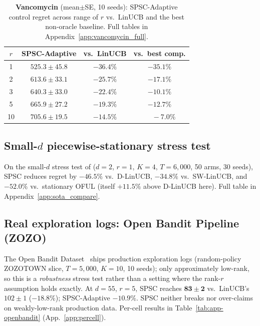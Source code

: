 \documentclass{article}
\begin{document}
\begin{table}[!htbp]
\centering
\caption{\textbf{Vancomycin} (mean$\pm$SE, 10 seeds): SPSC-Adaptive
control regret across range of $r$ vs.\ LinUCB and the best
non-oracle baseline. Full tables in
Appendix~\ref{app:vancomycin_full}.}
\label{tab:vancomycin_body}
\small
\setlength{\tabcolsep}{6pt}
\begin{tabular}{cccc}
\toprule
$r$ & SPSC-Adaptive  & vs.\ LinUCB & vs.\ best comp.\\
\midrule
1   & $\mathbf{525.3\pm 45.8}$ & $-36.4\%$ & $-35.1\%$ \\
2   & $\mathbf{613.6\pm 33.1}$ & $-25.7\%$ & $-17.1\%$ \\
3   & $\mathbf{640.3\pm 33.0}$ & $-22.4\%$ & $-10.1\%$ \\
5   & $\mathbf{665.9\pm 27.2}$ & $-19.3\%$ & $-12.7\%$ \\
10  & $\mathbf{705.6\pm 19.5}$ & $-14.5\%$ & $\phantom{-}-7.0\%$ \\
\bottomrule
\end{tabular}
\end{table}

\subsection{Small-$d$ piecewise-stationary stress test}
\label{sec:exp_russac}

On the small-$d$ stress test of \citet{russac2019weighted}
($d{=}2$, $r{=}1$, $K{=}4$, $T{=}6{,}000$, 50 arms, 30 seeds), SPSC
reduces regret by $\mathbf{-46.5\%}$ vs.\ D-LinUCB,
$\mathbf{-34.8\%}$ vs.\ SW-LinUCB, and $\mathbf{-52.0\%}$ vs.\
stationary OFUL (itself
$+11.5\%$ above D-LinUCB here). Full table in
Appendix~\ref{app:sota_compare}.

\subsection{Real exploration logs: Open Bandit Pipeline (ZOZO)}
\label{sec:exp_openbandit}

The Open Bandit Dataset~\citep{saito2020open} ships production
exploration logs (random-policy ZOZOTOWN slice, $T{=}5{,}000$,
$K{=}10$, 10 seeds); only approximately low-rank, so this is a
\emph{robustness} stress test rather than a setting where the rank-$r$
assumption holds exactly. At $d{=}55$, $r{=}5$, SPSC reaches
$\mathbf{83\pm 2}$ vs.\ LinUCB's $102\pm 1$ ($-18.8\%$); SPSC-Adaptive
$-10.9\%$. SPSC neither breaks nor over-claims on weakly-low-rank
production data. Per-cell results in Table~\ref{tab:app-openbandit}
(App.~\ref{app:percell}).
\end{document}
